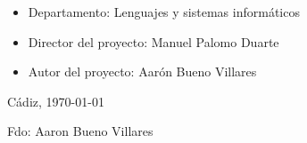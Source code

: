 \begin{itemize}
\item \large{Departamento: Lenguajes y sistemas informáticos}
\item \large{Director del proyecto: Manuel Palomo Duarte}
\item \large{Autor del proyecto: Aarón Bueno Villares}
\end{itemize}

\vspace{1.0cm}

\begin{flushright}
  \large{Cádiz, \today} \\

  \vspace{2.5cm}

  \large{Fdo: Aaron Bueno Villares}
\end{flushright}
